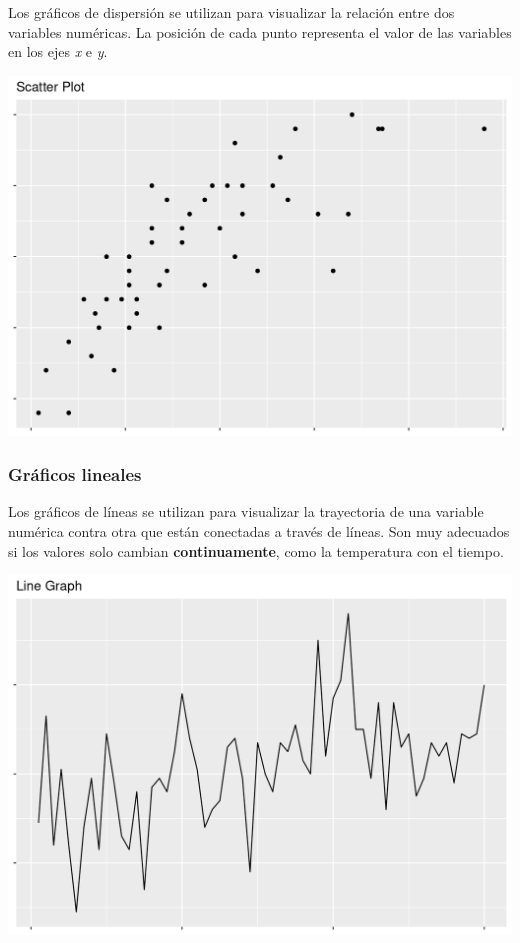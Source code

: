 \documentclass[
]{book}
\begin{document}
Los gráficos de dispersión se utilizan para visualizar la relación entre dos variables numéricas. La posición de cada punto representa el valor de las variables en los ejes \emph{x} e \emph{y}.

\includegraphics{img/scat.png}

\hypertarget{gruxe1ficos-lineales}{%
\subsubsection{Gráficos lineales}\label{gruxe1ficos-lineales}}

Los gráficos de líneas se utilizan para visualizar la trayectoria de una variable numérica contra otra que están conectadas a través de líneas. Son muy adecuados si los valores solo cambian \textbf{continuamente}, como la temperatura con el tiempo.

\includegraphics{img/unna.png}
\end{document}
